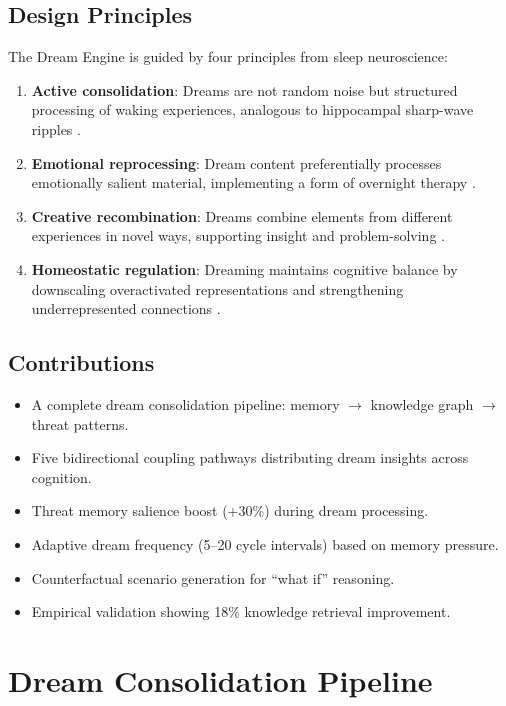 \documentclass[11pt,a4paper]{article}
\begin{document}
\subsection{Design Principles}

The Dream Engine is guided by four principles from sleep neuroscience:

\begin{enumerate}[nosep]
    \item \textbf{Active consolidation}: Dreams are not random noise but structured processing of waking experiences, analogous to hippocampal sharp-wave ripples \citep{buzsaki2015}.
    \item \textbf{Emotional reprocessing}: Dream content preferentially processes emotionally salient material, implementing a form of overnight therapy \citep{walker2009}.
    \item \textbf{Creative recombination}: Dreams combine elements from different experiences in novel ways, supporting insight and problem-solving \citep{cai2009}.
    \item \textbf{Homeostatic regulation}: Dreaming maintains cognitive balance by downscaling overactivated representations and strengthening underrepresented connections \citep{tononi2006}.
\end{enumerate}

\subsection{Contributions}

\begin{itemize}[nosep]
    \item A complete dream consolidation pipeline: memory $\to$ knowledge graph $\to$ threat patterns.
    \item Five bidirectional coupling pathways distributing dream insights across cognition.
    \item Threat memory salience boost (+30\%) during dream processing.
    \item Adaptive dream frequency (5--20 cycle intervals) based on memory pressure.
    \item Counterfactual scenario generation for ``what if'' reasoning.
    \item Empirical validation showing 18\% knowledge retrieval improvement.
\end{itemize}

\section{Dream Consolidation Pipeline}
\end{document}
